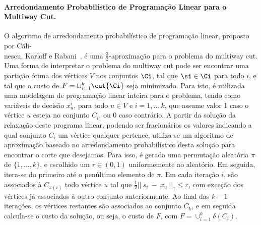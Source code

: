 \documentclass[12pt, a4paper]{article}
\begin{document}
\paragraph{Arredondamento Probabilístico de Programação Linear para o Multiway Cut.}
O algoritmo de arredondamento probabilístico de programação linear, proposto por Căli-\\nescu, Karloff e Rabani~\cite{CKR2000}, é uma $\frac{3}{2}$-aproximação para o problema do multiway cut.
%
Uma forma de interpretar o problema do multiway cut pode ser encontrar uma partição ótima dos vértices $V$ nos conjuntos $\Ci$, tal que $\si \in \Ci$ para todo $i$, e tal que o custo de $F = \cup_{i = 1}^{k} \cut{\Ci}$ seja minimizado.
%
Para isto, é utilizada uma modelagem de programação linear inteira para o problema, tendo como variáveis de decisão $x_{u}^{i}$, para todo $u \in V$ e $i = 1, \dots\ k$, que assume valor 1 caso o vértice $u$ esteja no conjunto $C_{i}$, ou 0 caso contrário.
A partir da solução da relaxação deste programa linear, podendo ser fracionários os valores indicando a qual conjunto $C_{i}$ um vértice qualquer pertence, utiliza-se um algoritmo de aproximação baseado no arredondamento probabilístico desta solução para encontrar o corte que desejamos.
%
Para isso, é gerada uma permutação aleatória $\pi$ de $\{1, \dots, k\}$, e escolhido um $r \in (0, 1)$ uniformemente ao aleatório. Em seguida, itera-se do primeiro até o penúltimo elemento de $\pi$. Em cada iteração $i$, são associados à $C_{\pi(i)}$ todo vértice $u$ tal que $\frac{1}{2}||~s_{i}~-~x_{u}~||_{1} \leq r$, com exceção dos vértices já associados à outro conjunto anteriormente.
%
Ao final das $k-1$ iterações, os vértices restantes são associados ao conjunto $C_k$, e em seguida calcula-se o custo da solução, ou seja, o custo de $F$, com $F = \cup_{i = 1}^{k} \delta(C_{i})$.
\end{document}
